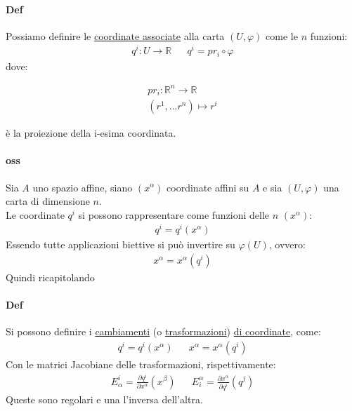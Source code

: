 \documentclass[10pt,a4paper]{book}
\begin{document}
\paragraph{Def} Possiamo definire le \underline{coordinate associate} alla carta $(U,\varphi)$ come le $n$ funzioni:
\begin{align*}
    q^i\colon U\to \mathbb{R}&&
    q^i=pr_i\circ \varphi
\end{align*}
dove:\begin{minipage}{4cm}
\begin{align*}
pr_i\colon\mathbb{R}^n\to \mathbb{R}\\
    (r^1,...r^n)\mapsto r^i
\end{align*}
\end{minipage}
\begin{minipage}{7cm}
è la proiezione della i-esima coordinata.
\end{minipage}
\paragraph{oss} Sia $A$ uno spazio affine, siano $(x^\alpha)$ coordinate affini su $A$ e sia $(U,\varphi)$ una carta di dimensione $n$.\\
Le coordinate $q^i$ si possono rappresentare come funzioni delle $n$ $(x^\alpha)$:
\begin{align*}
    q^i=q^i(x^\alpha)
\end{align*}
Essendo tutte applicazioni biettive si può invertire su $\varphi (U)$, ovvero:
\begin{align*}
    x^\alpha=x^\alpha(q^i)
\end{align*}
Quindi ricapitolando
\paragraph{Def} Si possono definire i \underline{cambiamenti} (o \underline{trasformazioni}) \underline{di coordinate}, come:
\begin{align*}
    q^i=q^i(x^\alpha) && x^\alpha=x^\alpha(q^i)
\end{align*}
Con le matrici Jacobiane delle trasformazioni, rispettivamente:
\begin{align*}
    E^i_\alpha= \frac{\partial q^i}{\partial x^\alpha} (x^\beta) && E^\alpha_i= \frac{\partial x^\alpha}{\partial q^i} (q^j)
\end{align*}
Queste sono regolari e una l'inversa dell'altra.
\end{document}
